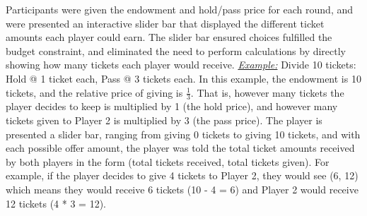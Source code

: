 \documentclass[12pt]{article}
\begin{document}
\begin{itemize}
Participants were given the endowment and hold/pass price for each round, and were presented an interactive slider bar that displayed the different ticket amounts each player could earn. The slider bar ensured choices fulfilled the budget constraint, and eliminated the need to perform calculations by directly showing how many tickets each player would receive.
\subitem \underline{\textit{Example:}} Divide 10 tickets: Hold @ 1 ticket each, Pass @ 3 tickets each. In this example, the endowment is 10 tickets, and the relative price of giving is \(\frac{1}{3}\). That is, however many tickets the player decides to keep is multiplied by 1 (the hold price), and however many tickets given to Player 2 is multiplied by 3 (the pass price). The player is presented a slider bar, ranging from giving 0 tickets to giving 10 tickets, and with each possible offer amount, the player was told the total ticket amounts received by both players in the form (total tickets received, total tickets given). For example, if the player decides to give 4 tickets to Player 2, they would see (6, 12) which means they would receive 6 tickets (10 - 4 = 6) and Player 2 would receive 12 tickets (4 * 3 = 12).


\end{itemize}
\end{document}
